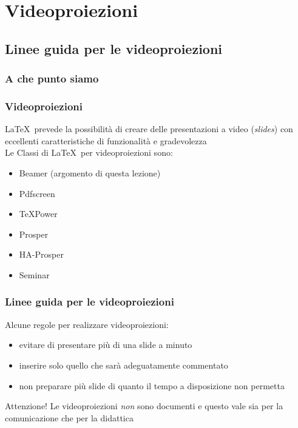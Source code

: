 \documentclass[svgnames,%
	ucs,%
	pdftex]{guitbeamer}
\begin{document}
\section{Videoproiezioni}
\subsection[Linee guida]{Linee guida per le videoproiezioni}
\begin{frame}
  \frametitle{A che punto siamo}
\end{frame}
\begin{frame}
  \frametitle{Videoproiezioni}
	\LaTeX\ prevede la possibilit\`a di creare delle presentazioni a video (\textit{slides}) con eccellenti caratteristiche di funzionalit\`a e gradevolezza\\
  \bigskip
	Le Classi di \LaTeX\ per videoproiezioni sono:
	\begin{itemize}
		\item Beamer (argomento di questa lezione)
		\item Pdfscreen
		\item \TeX Power
		\item Prosper
		\item HA-Prosper
		\item Seminar
	\end{itemize}
\end{frame}
\begin{frame}
  \frametitle{Linee guida per le videoproiezioni}
	Alcune regole per realizzare videoproiezioni:\\
	\begin{itemize}
		\item evitare di presentare pi\`u di una slide a minuto
		\item inserire solo quello che sar\`a adeguatamente commentato
		\item non preparare pi\`u slide di quanto il tempo a disposizione non permetta
	\end{itemize}
	\begin{block}{Attenzione!}
	Le videoproiezioni \emph{non} sono documenti
	\newline
	e questo vale sia per la comunicazione che per la didattica
	\end{block}
\end{frame}
\end{document}
